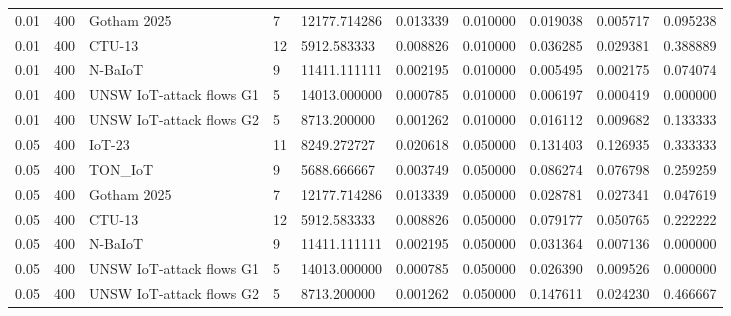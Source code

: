 \begin{tabular}{llllllllll}
0.01 & 400 & Gotham 2025 & 7 & 12177.714286 & 0.013339 & 0.010000 & 0.019038 & 0.005717 & 0.095238 \\
0.01 & 400 & CTU-13 & 12 & 5912.583333 & 0.008826 & 0.010000 & 0.036285 & 0.029381 & 0.388889 \\
0.01 & 400 & N-BaIoT & 9 & 11411.111111 & 0.002195 & 0.010000 & 0.005495 & 0.002175 & 0.074074 \\
0.01 & 400 & UNSW IoT-attack flows G1 & 5 & 14013.000000 & 0.000785 & 0.010000 & 0.006197 & 0.000419 & 0.000000 \\
0.01 & 400 & UNSW IoT-attack flows G2 & 5 & 8713.200000 & 0.001262 & 0.010000 & 0.016112 & 0.009682 & 0.133333 \\
0.05 & 400 & IoT-23 & 11 & 8249.272727 & 0.020618 & 0.050000 & 0.131403 & 0.126935 & 0.333333 \\
0.05 & 400 & TON\_IoT & 9 & 5688.666667 & 0.003749 & 0.050000 & 0.086274 & 0.076798 & 0.259259 \\
0.05 & 400 & Gotham 2025 & 7 & 12177.714286 & 0.013339 & 0.050000 & 0.028781 & 0.027341 & 0.047619 \\
0.05 & 400 & CTU-13 & 12 & 5912.583333 & 0.008826 & 0.050000 & 0.079177 & 0.050765 & 0.222222 \\
0.05 & 400 & N-BaIoT & 9 & 11411.111111 & 0.002195 & 0.050000 & 0.031364 & 0.007136 & 0.000000 \\
0.05 & 400 & UNSW IoT-attack flows G1 & 5 & 14013.000000 & 0.000785 & 0.050000 & 0.026390 & 0.009526 & 0.000000 \\
0.05 & 400 & UNSW IoT-attack flows G2 & 5 & 8713.200000 & 0.001262 & 0.050000 & 0.147611 & 0.024230 & 0.466667 \\
\bottomrule
\end{tabular}
